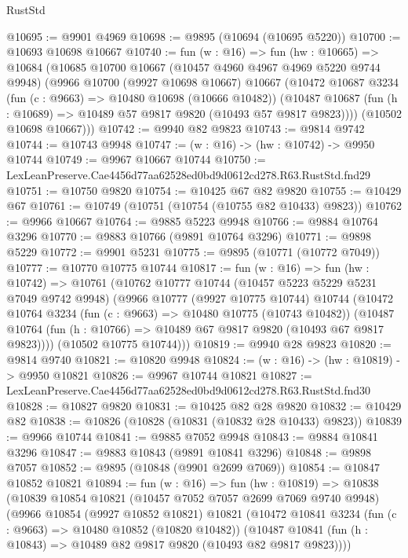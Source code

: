 \begin{lexlean}{RustStd}
\begin{coremodule}
@10695 := @9901 @4969
@10698 := @9895 (@10694 (@10695 @5220))
@10700 := @10693 @10698 @10667
@10740 := fun (w : @16) =>
  fun (hw : @10665) =>
  @10684
    (@10685
      @10700
      @10667
      (@10457 @4960 @4967 @4969 @5220 @9744 @9948)
      (@9966
        @10700
        (@9927 @10698 @10667)
        @10667
        (@10472
          @10687
          @3234
          (fun (c : @9663) => @10480 @10698 (@10666 @10482))
          (@10487 @10687 (fun (h : @10689) => @10489 @57 @9817 @9820 (@10493 @57 @9817 @9823))))
        (@10502 @10698 @10667)))
@10742 := @9940 @82 @9823
@10743 := @9814 @9742
@10744 := @10743 @9948
@10747 := (w : @16) -> (hw : @10742) -> @9950 @10744
@10749 := @9967 @10667 @10744
@10750 := LexLeanPreserve.Cae4456d77aa62528ed0bd9d0612cd278.R63.RustStd.fnd29
@10751 := @10750 @9820
@10754 := @10425 @67 @82 @9820
@10755 := @10429 @67
@10761 := @10749 (@10751 (@10754 (@10755 @82 @10433) @9823))
@10762 := @9966 @10667
@10764 := @9885 @5223 @9948
@10766 := @9884 @10764 @3296
@10770 := @9883 @10766 (@9891 @10764 @3296)
@10771 := @9898 @5229
@10772 := @9901 @5231
@10775 := @9895 (@10771 (@10772 @7049))
@10777 := @10770 @10775 @10744
@10817 := fun (w : @16) =>
  fun (hw : @10742) =>
  @10761
    (@10762
      @10777
      @10744
      (@10457 @5223 @5229 @5231 @7049 @9742 @9948)
      (@9966
        @10777
        (@9927 @10775 @10744)
        @10744
        (@10472
          @10764
          @3234
          (fun (c : @9663) => @10480 @10775 (@10743 @10482))
          (@10487 @10764 (fun (h : @10766) => @10489 @67 @9817 @9820 (@10493 @67 @9817 @9823))))
        (@10502 @10775 @10744)))
@10819 := @9940 @28 @9823
@10820 := @9814 @9740
@10821 := @10820 @9948
@10824 := (w : @16) -> (hw : @10819) -> @9950 @10821
@10826 := @9967 @10744 @10821
@10827 := LexLeanPreserve.Cae4456d77aa62528ed0bd9d0612cd278.R63.RustStd.fnd30
@10828 := @10827 @9820
@10831 := @10425 @82 @28 @9820
@10832 := @10429 @82
@10838 := @10826 (@10828 (@10831 (@10832 @28 @10433) @9823))
@10839 := @9966 @10744
@10841 := @9885 @7052 @9948
@10843 := @9884 @10841 @3296
@10847 := @9883 @10843 (@9891 @10841 @3296)
@10848 := @9898 @7057
@10852 := @9895 (@10848 (@9901 @2699 @7069))
@10854 := @10847 @10852 @10821
@10894 := fun (w : @16) =>
  fun (hw : @10819) =>
  @10838
    (@10839
      @10854
      @10821
      (@10457 @7052 @7057 @2699 @7069 @9740 @9948)
      (@9966
        @10854
        (@9927 @10852 @10821)
        @10821
        (@10472
          @10841
          @3234
          (fun (c : @9663) => @10480 @10852 (@10820 @10482))
          (@10487 @10841 (fun (h : @10843) => @10489 @82 @9817 @9820 (@10493 @82 @9817 @9823))))

\end{coremodule}
\end{lexlean}
